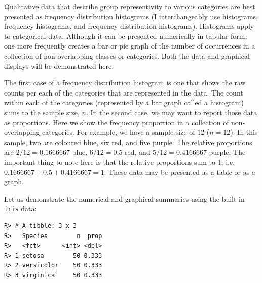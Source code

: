 \documentclass[english,10pt,a4paper,oneside]{book}
\newenvironment{Shaded}{\begin{snugshade}}{\end{snugshade}}
\newcommand{\KeywordTok}[1]{\textcolor[rgb]{0.13,0.29,0.53}{\textbf{#1}}}
\newcommand{\DataTypeTok}[1]{\textcolor[rgb]{0.13,0.29,0.53}{#1}}
\newcommand{\StringTok}[1]{\textcolor[rgb]{0.31,0.60,0.02}{#1}}
\newcommand{\CommentTok}[1]{\textcolor[rgb]{0.56,0.35,0.01}{\textit{#1}}}
\newcommand{\OperatorTok}[1]{\textcolor[rgb]{0.81,0.36,0.00}{\textbf{#1}}}
\newcommand{\NormalTok}[1]{#1}
\theoremstyle{definition}
\theoremstyle{definition}
\theoremstyle{definition}
\theoremstyle{remark}
\begin{document}
Qualitative data that describe group representivity to various
categories are best presented as frequency distribution histograms (I
interchangeably use histograms, frequency histograms, and frequency
distribution histograms). Histograms apply to categorical data. Although
it can be presented numerically in tabular form, one more frequently
creates a bar or pie graph of the number of occurrences in a collection
of non-overlapping classes or categories. Both the data and graphical
displays will be demonstrated here.

The first case of a frequency distribution histogram is one that shows
the raw counts per each of the categories that are represented in the
data. The count within each of the categories (represented by a bar
graph called a histogram) sums to the sample size, \(n\). In the second
case, we may want to report those data as proportions. Here we show the
frequency proportion in a collection of non-overlapping categories. For
example, we have a sample size of 12 (\(n=12\)). In this sample, two are
coloured blue, six red, and five purple. The relative proportions are
\(2/12=0.1666667\) blue, \(6/12=0.5\) red, and \(5/12=0.4166667\)
purple. The important thing to note here is that the relative
proportions sum to 1, i.e. \(0.1666667+0.5+0.4166667=1\). These data may
be presented as a table or as a graph.

Let us demonstrate the numerical and graphical summaries using the
built-in \texttt{iris} data:

\begin{Shaded}
\end{Shaded}

\begin{verbatim}
R> # A tibble: 3 x 3
R>   Species        n  prop
R>   <fct>      <int> <dbl>
R> 1 setosa        50 0.333
R> 2 versicolor    50 0.333
R> 3 virginica     50 0.333
\end{verbatim}
\end{document}
